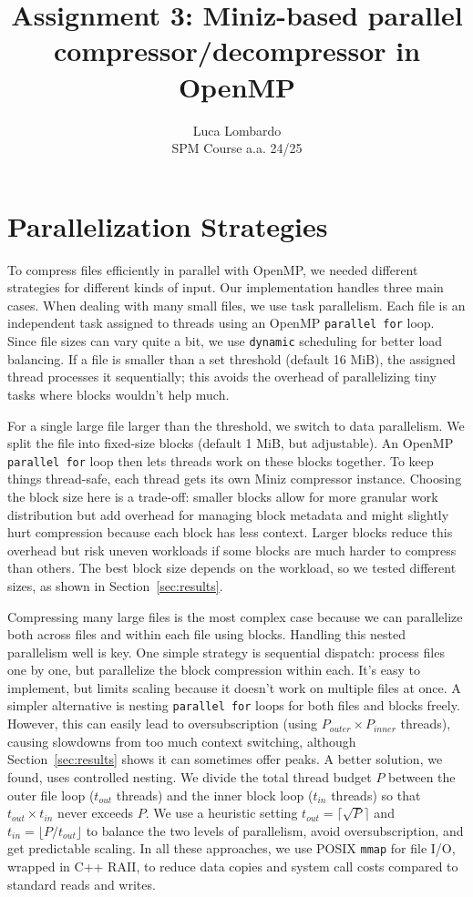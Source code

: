 \documentclass[10pt]{article}
\title{Assignment 3: Miniz-based parallel compressor/decompressor in OpenMP}
\author{Luca Lombardo \\ SPM Course a.a. 24/25}
\date{}
\newcommand{\code}[1]{\texttt{#1}}
\begin{document}
\maketitle
\vspace{-1.5em} %

\section{Parallelization Strategies}

To compress files efficiently in parallel with OpenMP, we needed different strategies for different kinds of input. Our implementation handles three main cases. When dealing with many small files, we use task parallelism. Each file is an independent task assigned to threads using an OpenMP \code{parallel for} loop. Since file sizes can vary quite a bit, we use \code{dynamic} scheduling for better load balancing. If a file is smaller than a set threshold (default 16 MiB), the assigned thread processes it sequentially; this avoids the overhead of parallelizing tiny tasks where blocks wouldn't help much.

For a single large file larger than the threshold, we switch to data parallelism. We split the file into fixed-size blocks (default 1 MiB, but adjustable). An OpenMP \code{parallel for} loop then lets threads work on these blocks together. To keep things thread-safe, each thread gets its own Miniz compressor instance. Choosing the block size here is a trade-off: smaller blocks allow for more granular work distribution but add overhead for managing block metadata and might slightly hurt compression because each block has less context. Larger blocks reduce this overhead but risk uneven workloads if some blocks are much harder to compress than others. The best block size depends on the workload, so we tested different sizes, as shown in Section~\ref{sec:results}.

Compressing many large files is the most complex case because we can parallelize both across files and within each file using blocks. Handling this nested parallelism well is key. One simple strategy is sequential dispatch: process files one by one, but parallelize the block compression within each. It's easy to implement, but limits scaling because it doesn't work on multiple files at once. A simpler alternative is nesting \code{parallel for} loops for both files and blocks freely. However, this can easily lead to oversubscription (using $P_{outer} \times P_{inner}$ threads), causing slowdowns from too much context switching, although Section~\ref{sec:results} shows it can sometimes offer peaks. A better solution, we found, uses controlled nesting. We divide the total thread budget $P$ between the outer file loop ($t_{out}$ threads) and the inner block loop ($t_{in}$ threads) so that $t_{out} \times t_{in}$ never exceeds $P$. We use a heuristic setting $t_{out} = \lceil \sqrt{P} \rceil$ and $t_{in} = \lfloor P / t_{out} \rfloor$ to balance the two levels of parallelism, avoid oversubscription, and get predictable scaling. In all these approaches, we use POSIX \code{mmap} for file I/O, wrapped in C++ RAII, to reduce data copies and system call costs compared to standard reads and writes.
\end{document}
